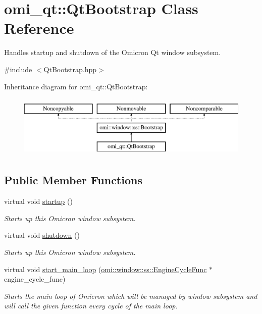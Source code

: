 \hypertarget{classomi__qt_1_1_qt_bootstrap}{}\section{omi\+\_\+qt\+:\+:Qt\+Bootstrap Class Reference}
\label{classomi__qt_1_1_qt_bootstrap}


Handles startup and shutdown of the Omicron Qt window subsystem.  




{\ttfamily \#include $<$Qt\+Bootstrap.\+hpp$>$}

Inheritance diagram for omi\+\_\+qt\+:\+:Qt\+Bootstrap\+:\begin{figure}[H]
\begin{center}
\leavevmode
\includegraphics[height=3.000000cm]{classomi__qt_1_1_qt_bootstrap}
\end{center}
\end{figure}
\subsection*{Public Member Functions}
\begin{DoxyCompactItemize}
\item 
virtual void \hyperlink{classomi__qt_1_1_qt_bootstrap_ae86dd5217529263238e51228c248e74f}{startup} ()
\begin{DoxyCompactList}\small\item\em Starts up this Omicron window subsystem. \end{DoxyCompactList}\item 
virtual void \hyperlink{classomi__qt_1_1_qt_bootstrap_a80d703cd4cb032ed900c1d77ea0056ab}{shutdown} ()
\begin{DoxyCompactList}\small\item\em Starts up this Omicron window subsystem. \end{DoxyCompactList}\item 
virtual void \hyperlink{classomi__qt_1_1_qt_bootstrap_ab603ff5f3f6a7637b7daf143943f5e62}{start\+\_\+main\+\_\+loop} (\hyperlink{namespaceomi_1_1window_1_1ss_af42d2464a170bdfd876a35b9fde16137}{omi\+::window\+::ss\+::\+Engine\+Cycle\+Func} $\ast$engine\+\_\+cycle\+\_\+func)\hypertarget{classomi__qt_1_1_qt_bootstrap_ab603ff5f3f6a7637b7daf143943f5e62}{}\label{classomi__qt_1_1_qt_bootstrap_ab603ff5f3f6a7637b7daf143943f5e62}

\begin{DoxyCompactList}\small\item\em Starts the main loop of Omicron which will be managed by window subsystem and will call the given function every cycle of the main loop. \end{DoxyCompactList}\end{DoxyCompactItemize}
